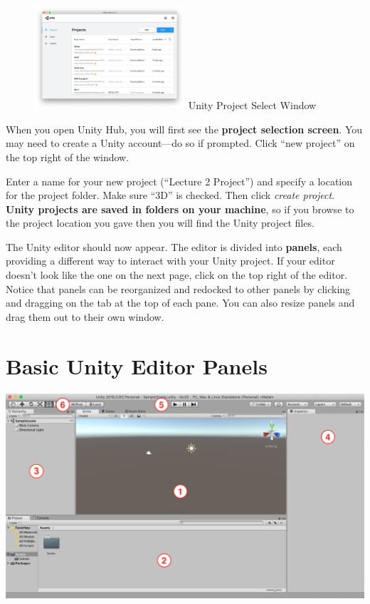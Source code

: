 \documentclass[11pt]{article}
\begin{document}
\begin{figure}
    \centering
    \includegraphics[width=0.5\textwidth]{proj-select}
    Unity Project Select Window
\end{figure}


When you open Unity Hub, you will first see the {\bf project selection screen}.  You may need to create a Unity account—do so if prompted.  Click ``new project'' on the top right of the window.

Enter a name for your new project (``Lecture 2 Project'') and specify a location for the project folder.  Make sure ``3D'' is checked.  Then click {\it create project}.  \textbf{Unity projects are saved in folders on your machine}, so if you browse to the project location you gave then you will find the Unity project files.

The Unity editor should now appear.  The editor is divided into \textbf{panels}, each providing a different way to interact with your Unity project.  If your editor doesn’t look like the one on the next page, click  on the top right of the editor.  Notice that panels can be reorganized and redocked to other panels by clicking and dragging on the tab at the top of each pane.  You can also resize panels and drag them out to their own window.

\pagebreak
\section{Basic Unity Editor Panels}

{
\centering \noindent
\includegraphics[width=1.0\textwidth]{basic-editor-panes}
}
\end{document}
